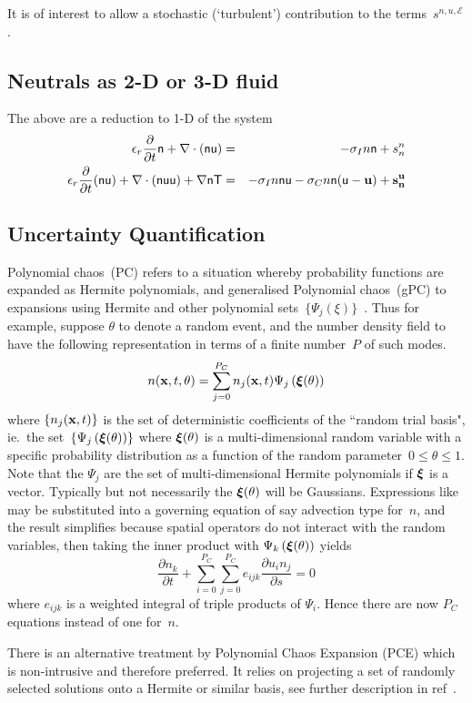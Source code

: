 It is of interest to allow a stochastic (`turbulent') contribution to the terms~$s^{n,u,\mathcal{E}}$.

\subsection{Neutrals as 2-D or 3-D fluid}\label{sec:sys23neutrals}
The above  are a reduction to 1-D of the system
\begin{eqnarray}
\epsilon_r \frac{\partial}{\partial t} {\sf n} +
\nabla \cdot({\sf n} {\bf\sf u})&=& -\sigma_I n {\sf n} + s^n_n \label{eq:syvcnn}\\
\epsilon_r \frac{\partial}{\partial t} ({\sf n} {\bf\sf u})+
\nabla \cdot ({\sf n} {\bf\sf u} {\bf\sf u}) + \nabla {\sf n} {\sf T} &=&
-\sigma_I n {\sf n} {\bf\sf u} - \sigma_C n {\sf n} ({\bf\sf u}-\bf{u}) +s^u_n \label{eq:syvcnu}
\end{eqnarray}

\subsection{Uncertainty Quantification}\label{sec:sys23UQ}
Polynomial chaos~(PC) refers to a situation whereby probability
functions are expanded as Hermite polynomials, and generalised
Polynomial chaos~(gPC) to expansions using Hermite and other
polynomial sets~$\{\Psi_j(\xi)\}$~\cite{Xi03Mode}.
Thus for example, suppose $\theta$ to denote a random event, and the number density field
to have the following representation in terms of a finite number~$P$ of such modes.
\begin{equation}\label{eq:TrepgPC}
n({\bf x},t, \theta) = \sum_{j=0}^{P_C} n_j({\bf x},t) \Psi_j \left(\mbox{\boldmath $\xi$}(\theta)\right)
\end{equation}
where
$\{ n_j({\bf x},t)\}$ is the set of deterministic coefficients of the ``random trial basis",
ie.\ the set~$\{ \Psi_j \left(\mbox{\boldmath $\xi$}(\theta)\right) \}$ where $\mbox{\boldmath $\xi$}(\theta)$ 
is a multi-dimensional random variable with a specific 
probability distribution as a function of the random parameter~$0\leq\theta\leq 1$.
Note that the $\Psi_j$ are the set of multi-dimensional Hermite polynomials if $\mbox{\boldmath $\xi$}$ is a vector.
Typically but not necessarily the $\mbox{\boldmath $\xi$}(\theta)$ will be Gaussians.
Expressions like~ may be substituted into a governing
equation of say advection type for~$n$, and the result simplifies because spatial
operators do not interact with the random variables, then taking the inner product
with $\Psi_k \left(\mbox{\boldmath $\xi$}(\theta)\right)$ yields
\begin{equation}\label{eq:TgPC}
\frac{\partial n_k}{\partial t}+  
\sum_{i=0}^{P_C} \sum_{j=0}^{P_C} e_{ijk} \frac{\partial u_i n_j}{\partial s}=0
\end{equation}
where $e_{ijk}$ is a weighted integral of triple products of $\Psi_i$.
Hence there are now $P_C$ equations instead of one for~$n$.

There is an alternative treatment by Polynomial Chaos Expansion (PCE) which is non-intrusive
and therefore preferred. It relies on projecting a set of randomly selected solutions onto
a Hermite or similar basis, see further description in ref~\cite[end \S\,2.1.1]{y2re313}.
